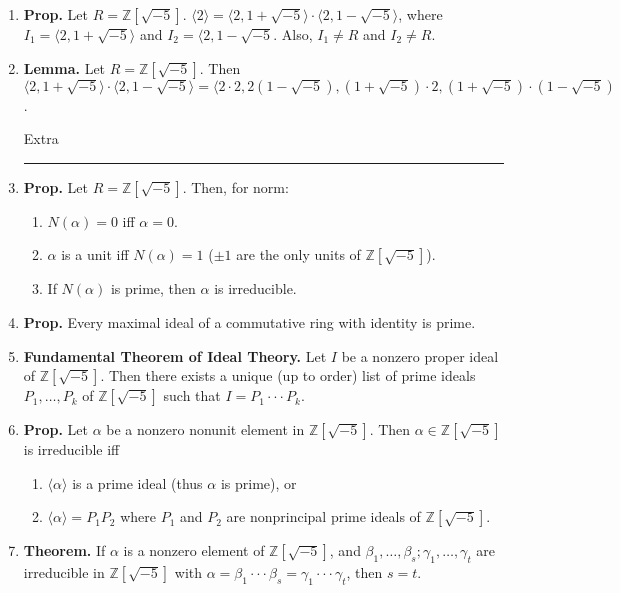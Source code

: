 \begin{enumerate}
	\item \textbf{Prop. } Let $R = \mathbb{Z}[\sqrt{-5}]$. $\langle 2 \rangle = \langle 2,1+\sqrt{-5} \rangle \cdot \langle 2, 1-\sqrt{-5} \rangle$, where $I_1 = \langle 2,1+\sqrt{-5} \rangle$ and $I_2 = \langle 2,1-\sqrt{-5}$. Also, $I_1 \neq R$ and $I_2 \neq R$. 
	\item \textbf{Lemma. } Let $R = \mathbb{Z}[\sqrt{-5}]$. Then $\langle 2,1+\sqrt{-5} \rangle \cdot \langle 2,1-\sqrt{-5} \rangle = \langle 2 \cdot 2, 2(1-\sqrt{-5}), (1+\sqrt{-5}) \cdot 2, (1+\sqrt{-5}) \cdot (1 - \sqrt{-5})$. 
	\begin{center}
		Extra \\
		\hrule 
	\end{center}
	\item \textbf{Prop. } Let $R = \mathbb{Z}[\sqrt{-5}]$. Then, for norm: 
	\begin{enumerate}
		\item $N(\alpha) = 0$ iff $\alpha = 0$. 
		\item $\alpha$ is a unit iff $N(\alpha)=1$ ($\pm 1$ are the only units of $\mathbb{Z}[\sqrt{-5}]$). 
		\item If $N(\alpha)$ is prime, then $\alpha$ is irreducible. 
	\end{enumerate}
	\item \textbf{Prop. } Every maximal ideal of a commutative ring with identity is prime. 
	\item \textbf{Fundamental Theorem of Ideal Theory. } Let $I$ be a nonzero proper ideal of $\mathbb{Z}[\sqrt{-5}]$. Then there exists a unique (up to order) list of prime ideals $P_1,\dots,P_k$ of $\mathbb{Z}[\sqrt{-5}]$ such that $I = P_1 \cdot \cdot \cdot P_k$. 
	\item \textbf{Prop. } Let $\alpha$ be a nonzero nonunit element in $\mathbb{Z}[\sqrt{-5}]$. Then $\alpha \in \mathbb{Z}[\sqrt{-5}]$ is irreducible iff 
	\begin{enumerate}
		\item $\langle \alpha \rangle$ is a prime ideal (thus $\alpha$ is prime), or
		\item $\langle \alpha \rangle = P_1P_2$ where $P_1$ and $P_2$ are nonprincipal prime ideals of $\mathbb{Z}[\sqrt{-5}]$. 
	\end{enumerate}
	\item \textbf{Theorem. } If $\alpha$ is a nonzero element of $\mathbb{Z}[\sqrt{-5}]$, and $\beta_1,\dots,\beta_s; \gamma_1,\dots,\gamma_t$ are irreducible in $\mathbb{Z}[\sqrt{-5}]$ with $\alpha = \beta_1 \cdot \cdot \cdot \beta_s = \gamma_1 \cdot \cdot \cdot \gamma_t$, then $s=t$. 

\end{enumerate}
